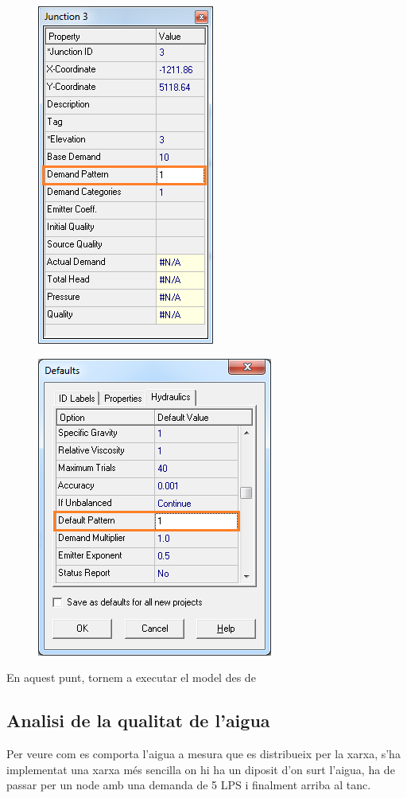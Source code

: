 \documentclass[12pt]{article}
\begin{document}
\begin{figure}[h!]
	\centering
	\includegraphics[scale=.7]{imatges/epanet/18.png}
	\label{fig:confNodeAnode}
\end{figure}
\begin{figure}[h!]
	\centering
	\includegraphics[scale=.7]{imatges/epanet/19.png}
	\label{fig:confGlobal}
\end{figure}
En aquest punt, tornem a executar el model des de 

\subsection{Analisi de la qualitat de l'aigua}
Per veure com es comporta l'aigua a mesura que es distribueix per la xarxa, s'ha implementat una xarxa més sencilla on hi ha un diposit d'on surt l'aigua, ha de passar per un node amb una demanda de 5 LPS i finalment arriba al tanc.
\end{document}
